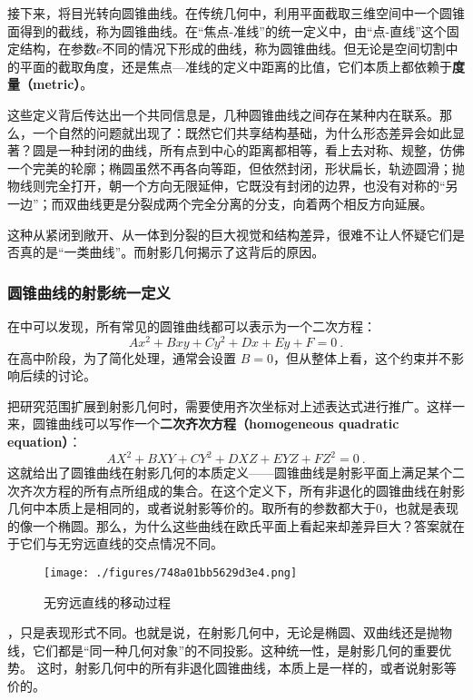 接下来，将目光转向圆锥曲线。在传统几何中，利用平面截取三维空间中一个圆锥面得到的截线，称为圆锥曲线。在“焦点-准线”的统一定义中，由“点-直线”这个固定结构，在参数$e$不同的情况下形成的曲线，称为圆锥曲线。但无论是空间切割中的平面的截取角度，还是焦点—准线的定义中距离的比值，它们本质上都依赖于\textbf{度量（metric）}。

这些定义背后传达出一个共同信息是，几种圆锥曲线之间存在某种内在联系。那么，一个自然的问题就出现了：既然它们共享结构基础，为什么形态差异会如此显著？圆是一种封闭的曲线，所有点到中心的距离都相等，看上去对称、规整，仿佛一个完美的轮廓；椭圆虽然不再各向等距，但依然封闭，形状扁长，轨迹圆滑；抛物线则完全打开，朝一个方向无限延伸，它既没有封闭的边界，也没有对称的“另一边”；而双曲线更是分裂成两个完全分离的分支，向着两个相反方向延展。

这种从紧闭到敞开、从一体到分裂的巨大视觉和结构差异，很难不让人怀疑它们是否真的是“一类曲线”。而射影几何揭示了这背后的原因。

\subsubsection{圆锥曲线的射影统一定义}

在中可以发现，所有常见的圆锥曲线都可以表示为一个二次方程：
\begin{equation}
Ax^2+Bxy+Cy^2+Dx+Ey+F=0~.
\end{equation}
在高中阶段，为了简化处理，通常会设置 $B = 0$，但从整体上看，这个约束并不影响后续的讨论。

把研究范围扩展到射影几何时，需要使用齐次坐标对上述表达式进行推广。这样一来，圆锥曲线可以写作一个\textbf{二次齐次方程（homogeneous quadratic equation）}：
\begin{equation}
AX^2 + BXY + CY^2 + DXZ + EYZ + FZ^2 = 0~.
\end{equation}
这就给出了圆锥曲线在射影几何的本质定义——圆锥曲线是射影平面上满足某个二次齐次方程的所有点所组成的集合。在这个定义下，所有非退化的圆锥曲线在射影几何中本质上是相同的，或者说射影等价的。取所有的参数都大于0，也就是表现的像一个椭圆。那么，为什么这些曲线在欧氏平面上看起来却差异巨大？答案就在于它们与无穷远直线的交点情况不同。

\begin{figure}[ht]
\centering
\texttt{[image: ./figures/748a01bb5629d3e4.png]}
\caption{无穷远直线的移动过程} \label{fig_HsPGCC_3}
\end{figure}


，只是表现形式不同。也就是说，在射影几何中，无论是椭圆、双曲线还是抛物线，它们都是“同一种几何对象”的不同投影。这种统一性，是射影几何的重要优势。
这时，射影几何中的所有非退化圆锥曲线，本质上是一样的，或者说射影等价的。

